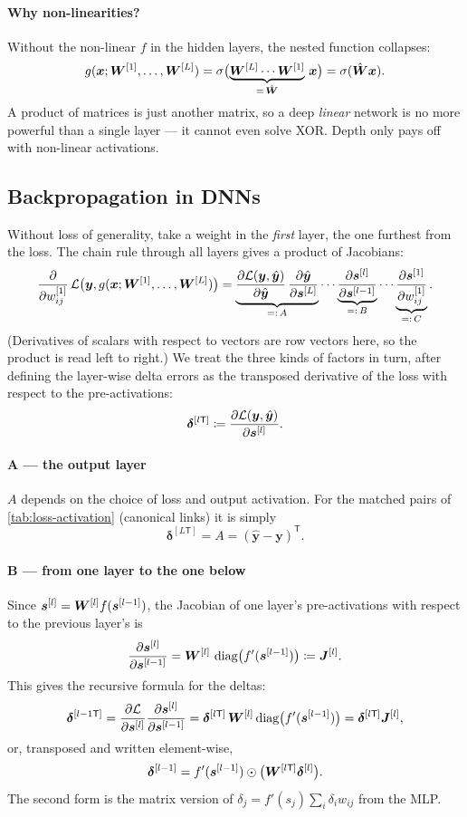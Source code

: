 \documentclass[11pt, oneside]{book}
\newcommand{\pd}[2]{\frac{\partial #1}{\partial #2}}
\newcommand{\T}{^{\mathsf{T}}}           %
\newcommand{\diag}{\operatorname{diag}}
\newcommand{\loss}{\mathcal{L}}          %
\newcommand{\params}{\boldsymbol{\theta}}   %
\newcommand{\eqdef}{\coloneqq}           %
\newcommand{\bx}{\bm{x}}        \newcommand{\by}{\bm{y}}
\newcommand{\bdelta}{\bm{\delta}}
\newcommand{\byhat}{\hat{\bm{y}}}
\newcommand{\lay}[1]{^{[#1]}}            %
\let\originalsubsection\subsection
\renewcommand{\subsection}{\Needspace{6\baselineskip}\originalsubsection}
\begin{document}
\paragraph{Why non-linearities?}
Without the non-linear $f$ in the hidden layers, the nested function
collapses:
\[
  g(\bx; \bW\lay{1}, \dots, \bW\lay{L})
  = \sigma\bigl(\underbrace{\bW\lay{L}\cdots\bW\lay{1}}_{=\,\hat\bW}\,\bx\bigr)
  = \sigma(\hat\bW\bx).
\]
A product of matrices is just another matrix, so a deep \emph{linear}
network is no more powerful than a single layer --- it cannot even solve
XOR. Depth only pays off with non-linear activations.

\subsection{Backpropagation in DNNs}
\label{sec:backprop-dnn}

Without loss of generality, take a weight in the \emph{first} layer, the one
furthest from the loss. The chain rule through all layers gives a product of
Jacobians:
\[
  \pd{}{w\lay{1}_{ij}}\,\loss\bigl(\by, g(\bx; \bW\lay{1}, \dots, \bW\lay{L})\bigr)
  = \underbrace{\pd{\loss(\by, \byhat)}{\byhat}\,\pd{\byhat}{\bs\lay{L}}}_{=:\,A}
    \cdots
    \underbrace{\pd{\bs\lay{l}}{\bs\lay{l-1}}}_{=:\,B}
    \cdots
    \underbrace{\pd{\bs\lay{1}}{w\lay{1}_{ij}}}_{=:\,C} .
\]
(Derivatives of scalars with respect to vectors are row vectors here, so
the product is read left to right.) We treat the three kinds of factors in
turn, after defining the layer-wise delta errors as the transposed
derivative of the loss with respect to the pre-activations:
\[
  \bdelta\lay{l\mathsf{T}} \coloneqq \pd{\loss(\by, \byhat)}{\bs\lay{l}} .
\]

\paragraph{A --- the output layer}
$A$ depends on the choice of loss and output activation. For the matched
pairs of \cref{tab:loss-activation} (canonical links) it is simply
\[
  \bdelta\lay{L\mathsf{T}} = A = (\byhat - \by)\T .
\]

\paragraph{B --- from one layer to the one below}
Since $\bs\lay{l} = \bW\lay{l} f(\bs\lay{l-1})$, the Jacobian of one layer's
pre-activations with respect to the previous layer's is
\[
  \pd{\bs\lay{l}}{\bs\lay{l-1}} = \bW\lay{l}\,\diag\bigl(f'(\bs\lay{l-1})\bigr)
  \eqdef \bJ\lay{l}.
\]
This gives the recursive formula for the deltas:
\[
  \bdelta\lay{l-1\mathsf{T}} = \pd{\loss}{\bs\lay{l}}\pd{\bs\lay{l}}{\bs\lay{l-1}}
  = \bdelta\lay{l\mathsf{T}}\,\bW\lay{l}\diag\bigl(f'(\bs\lay{l-1})\bigr)
  = \bdelta\lay{l\mathsf{T}}\bJ\lay{l},
\]
or, transposed and written element-wise,
\[
  \bdelta\lay{l-1} = f'(\bs\lay{l-1}) \odot \bigl(\bW\lay{l\mathsf{T}}\bdelta\lay{l}\bigr).
\]
The second form is the matrix version of
$\delta_j = f'(s_j)\sum_i\delta_i w_{ij}$ from the MLP.
\end{document}
